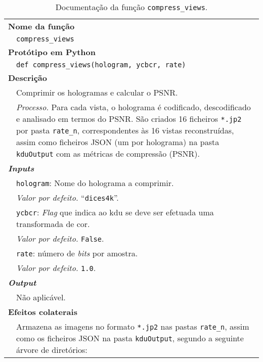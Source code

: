 \begin{table}[!hp]
    \centering
    \caption{Documentação da função \texttt{compress\_views}.}
    \label{tab:compress_views}
    \begin{tabular}{p{1cm} p{11.5cm}}
        \hline
        \multicolumn{2}{l}{\bfseries\small Nome da função}\\
         & \verb|compress_views|\\
        \hline
        \multicolumn{2}{l}{\bfseries\small Protótipo em Python}\\
         & \texttt{def compress_views(hologram, ycbcr, rate)} \\
        \hline\multicolumn{2}{l}{\bfseries\small Descrição}\\
         & Comprimir os hologramas e calcular o \ac{PSNR}. \\
         & \textit{Processo.} Para cada vista, o holograma é codificado, descodificado e analisado em termos do \ac{PSNR}. São criados 16 ficheiros \verb|*.jp2| por pasta \verb|rate_n|, correspondentes às 16 vistas reconstruídas, assim como ficheiros \ac{JSON} (um por holograma) na pasta \verb|kduOutput| com as métricas de compressão (\ac{PSNR}). \\
        \hline\multicolumn{2}{l}{\bfseries\small \textit{Inputs}}\\
         & \verb|hologram|: Nome do holograma a comprimir.\\
         & \hspace{1cm} \textit{Valor por defeito.} ``\verb|dices4k|''.\\
         & \verb|ycbcr|: \textit{Flag} que indica ao \ac{kdu} se deve ser efetuada uma transformada de cor.\\
         & \hspace{1cm} \textit{Valor por defeito.} \verb|False|.\\
         & \verb|rate|: número de \textit{bits} por amostra.\\
         & \hspace{1cm} \textit{Valor por defeito.} \verb|1.0|.\\
        \hline\multicolumn{2}{l}{\bfseries\small \textit{Output}}\\
         & Não aplicável.\\
        \hline\multicolumn{2}{l}{\bfseries\small Efeitos colaterais}\\
         & Armazena as imagens no formato \verb|*.jp2| nas pastas \verb|rate_n|, assim como os ficheiros \ac{JSON} na pasta \verb|kduOutput|, segundo a seguinte árvore de diretórios:\\

\end{tabular}
\end{table}
